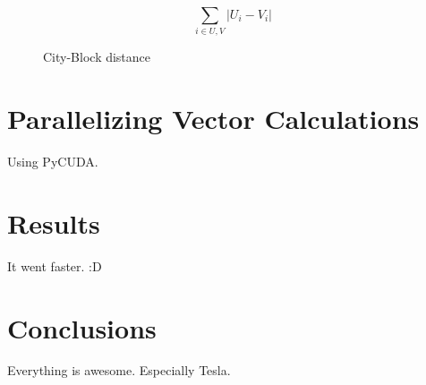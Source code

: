 \documentclass[12pt]{article}
\begin{document}
\begin{figure}
$$\sum_{i\in U,V} |U_i - V_i| $$
\caption{City-Block distance}
  \label{cityblock}
\end{figure}

\section{Parallelizing Vector Calculations}

Using PyCUDA. %

\section{Results}

It went faster. :D %


\section{Conclusions}
Everything is awesome. Especially Tesla.



\end{document}
